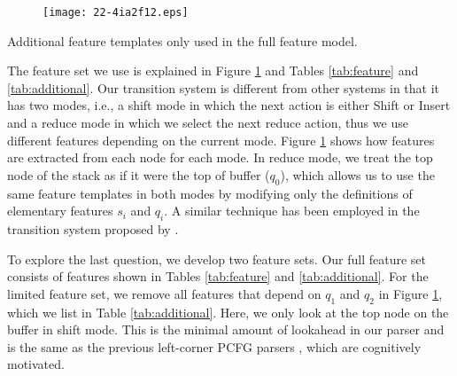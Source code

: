 \documentclass[english]{jnlp_1.4}
\begin{document}
\begin{figure}[t]
\begin{center}
\texttt{[image: 22-4ia2f12.eps]}
\end{center}
\label{fig:feature}
\end{figure}
\begin{table}[t]
\label{tab:feature}

\end{table}
\begin{table}[t]
\caption{Additional feature templates only used in the full feature model.}
\label{tab:additional}

\end{table}

The feature set we use is explained in Figure \ref{fig:feature} and Tables \ref{tab:feature} and \ref{tab:additional}.
Our transition system is different from other systems in that it has two modes, i.e., a shift mode in which the next action is either {\sc Shift} or {\sc Insert} and a reduce mode in which we select the next reduce action, thus we use different features depending on the current mode.
Figure \ref{fig:feature} shows how features are extracted from each node for each mode.
In reduce mode, we treat the top node of the stack as if it were the top of buffer ($q_0$), which allows us to use the same feature templates in both modes by modifying only the definitions of elementary features $s_i$ and $q_i$.
A similar technique has been employed in the transition system proposed by .

To explore the last question, we develop two feature sets.
Our full feature set consists of features shown in Tables \ref{tab:feature} and \ref{tab:additional}.
For the limited feature set, we remove all features that depend on $q_1$ and $q_2$ in Figure \ref{fig:feature}, which we list in Table \ref{tab:additional}.
Here, we only look at the top node on the buffer in shift mode.
This is the minimal amount of lookahead in our parser and is the same as the previous left-corner PCFG parsers \cite{journals/coling/SchulerAMS10}, which are cognitively motivated.
\end{document}
